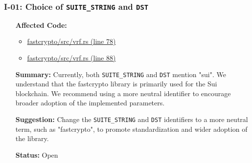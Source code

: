 \subsubsection*{I-01: Choice of \lstinline{SUITE_STRING} and \lstinline{DST}}
\begin{itemize}[align=left]
\item[\textbf{Affected Code:}]\
\begin{itemize}
\item \href{https://github.com/MystenLabs/fastcrypto/blob/963205c6d0538fe548b8b10037cf87a53af6f424/fastcrypto/src/vrf.rs#L78}{fastcrypto/src/vrf.rs (line 78)}
\item \href{https://github.com/MystenLabs/fastcrypto/blob/963205c6d0538fe548b8b10037cf87a53af6f424/fastcrypto/src/vrf.rs#L88}{fastcrypto/src/vrf.rs (line 88)}
\end{itemize}
\item[\textbf{Summary:}] Currently, both \lstinline{SUITE_STRING} and \lstinline{DST} mention "sui". We understand that the fastcrypto library is primarily used for the Sui blockchain. We recommend using a more neutral identifier to encourage broader adoption of the implemented parameters.
\item[\textbf{Suggestion:}] Change the \lstinline{SUITE_STRING} and \lstinline{DST} identifiers to a more neutral term, such as "fastcrypto", to promote standardization and wider adoption of the library.
\item[\textbf{Status:}] Open
\end{itemize}

